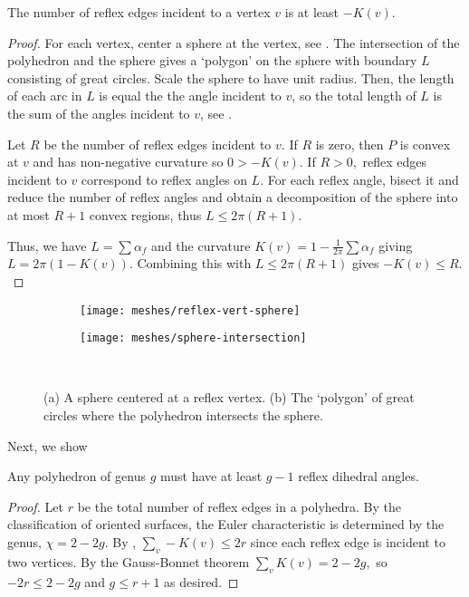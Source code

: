 \begin{lemma}\label{lem:reflex-edge}
The number of reflex edges  incident to a vertex $v$  is at least $-K(v).$
\end{lemma}

\begin{proof}

For each vertex, center a sphere at the vertex,
see .
The intersection of the polyhedron and the sphere
gives a `polygon' on the sphere with boundary $L$ consisting of great
circles. 
Scale the sphere to have unit radius. Then, the length of each arc
in $L$ is equal the the angle incident to $v$, so the total length of $L$ is
the sum of the angles incident to $v$, see .

Let $R$ be the number of reflex edges incident to $v$.
If $R$ is zero, then $P$ is convex at $v$ and has non-negative curvature
so $0>-K(v).$ If $R>0,$
reflex edges incident to $v$ correspond to reflex angles on $L$.
For each reflex angle, bisect it and reduce the 
number of reflex angles and obtain a decomposition
of the sphere into at most $R+1$ convex regions,
thus $L\leq 2\pi(R+1)$.

Thus, we have $L=\sum \alpha_f$ and the curvature 
$K(v)=1-\frac{1}{2\pi}\sum \alpha_f$ giving
$L=2\pi(1-K(v))$. Combining this with $L\leq 2\pi(R+1)$
gives $-K(v)\leq R.$


\end{proof}

\begin{figure}[htb]
        \centering
        \begin{subfigure}[b]{0.35\textwidth}
        \texttt{[image: meshes/reflex-vert-sphere]}
        \caption{}
          \label{fig:sphere-on-vert}
        \end{subfigure}
          \hspace{.0cm}
         \begin{subfigure}[b]{0.45\textwidth}
        \texttt{[image: meshes/sphere-intersection]}
        \caption{}
        \label{fig:sphere}
        \end{subfigure}\\
		\caption{(a) A sphere centered at a reflex vertex. (b) The `polygon'
		of great circles where the polyhedron intersects the sphere. 
		\label{fig:sphere}}
\end{figure}


Next, we show
\begin{theorem}\label{thm:reflex}

Any polyhedron of genus $g$ must have 
at least $g-1$ reflex dihedral angles. 

\end{theorem}
\begin{proof}
Let $r$ be the total number of reflex edges in a polyhedra.
By the classification of oriented surfaces, the Euler characteristic 
 is determined by the genus, $\chi=2-2g$.
By , $\sum_v -K(v)\leq 2 r$ since each
reflex edge is incident to two vertices.
By the Gauss-Bonnet theorem $\sum_vK(v)= 2-2g,$
so $-2r\leq 2-2g$ and $g\leq r+1$ as desired.

\end{proof}

